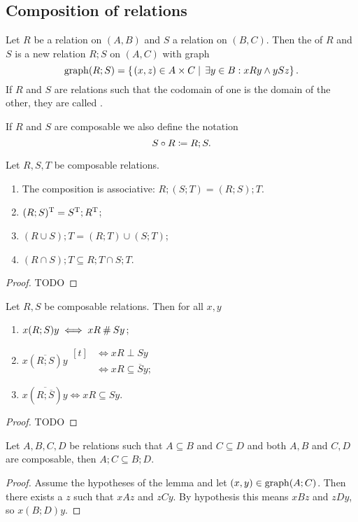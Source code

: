 \subsection{Composition of relations}
\begin{definition}
Let $R$ be a relation on $(A, B)$ and $S$ a relation on $(B, C)$. Then the  of $R$ and $S$ is a new relation $R;S$ on $(A, C)$ with graph
\[ \operatorname{graph}(R;S) = \left\{\left. (x,z)\in A\times C \;\right|\; \exists y\in B: xRy \land ySz \right\}. \]
If $R$ and $S$ are relations such that the codomain of one is the domain of the other, they are called .

If $R$ and $S$ are composable we also define the notation
\[ S\circ R \coloneqq R;S. \]
\end{definition}
\begin{lemma} \label{relationalComposition}
Let $R,S,T$ be composable relations.
\begin{enumerate}
\item The composition is associative: $R;(S;T) = (R;S);T$.
\item $(R;S)^{\mathrm{T}} = S^{\mathrm{T}} ; R^{\mathrm{T}}$;
\item $(R\cup S);T = (R;T) \cup (S;T)$;
\item $(R\cap S);T \subseteq R;T \cap S;T$.
\end{enumerate}
\end{lemma}
\begin{proof}
TODO
\end{proof}

\begin{lemma} \label{setOfRelationComposition}
Let $R,S$ be composable relations. Then for all $x,y$
\begin{enumerate}
\item $x(R;S)y \iff xR \mathbin{\#} Sy$;
\item $x(\overline{R;S})y \begin{aligned}[t]
&\iff xR\perp Sy \\
&\iff xR \subseteq \overline{S}y;
\end{aligned}$
\item $x(\overline{R;\overline{S}})y \iff xR \subseteq Sy$.
\end{enumerate}
\end{lemma}
\begin{proof}
TODO
\end{proof}

\begin{lemma}
Let $A,B,C,D$ be relations such that $A \subseteq B$ and $C\subseteq D$ and both $A,B$ and $C,D$ are composable, then $A;C\subseteq B;D$.
\end{lemma}
\begin{proof}
Assume the hypotheses of the lemma and let $(x,y) \in \operatorname{graph}(A;C)$. Then there exists a $z$ such that $xAz$ and $zCy$. By hypothesis this means $xBz$ and $zDy$, so $x(B;D)y$.
\end{proof}

